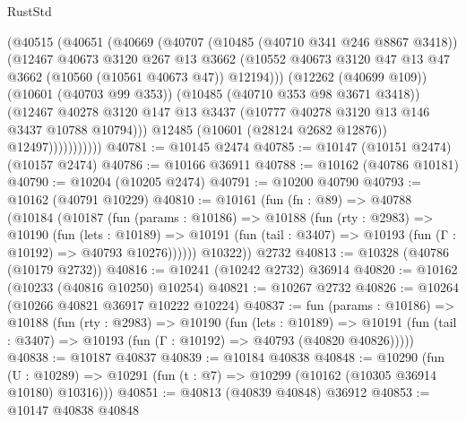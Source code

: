 \begin{lexlean}{RustStd}
\begin{coremodule}
                      (@40515
                        (@40651
                          (@40669
                            (@40707
                              (@10485 (@40710 @341 @246 @8867 @3418))
                              (@12467
                                @40673
                                @3120
                                @267
                                @13
                                @3662
                                (@10552
                                  @40673
                                  @3120
                                  @47
                                  @13
                                  @47
                                  @3662
                                  (@10560 (@10561 @40673 @47))
                                  @12194)))
                            (@12262 (@40699 @109))
                            (@10601 (@40703 @99 @353))
                            (@10485 (@40710 @353 @98 @3671 @3418))
                            (@12467
                              @40278
                              @3120
                              @147
                              @13
                              @3437
                              (@10777 @40278 @3120 @13 @146 @3437 @10788 @10794)))
                          @12485
                          (@10601 (@28124 @2682 @12876))
                          @12497)))))))))))
@40781 := @10145 @2474
@40785 := @10147 (@10151 @2474) (@10157 @2474)
@40786 := @10166 @36911
@40788 := @10162 (@40786 @10181)
@40790 := @10204 (@10205 @2474)
@40791 := @10200 @40790
@40793 := @10162 (@40791 @10229)
@40810 := @10161
    (fun (fn : @89) =>
    @40788
      (@10184
        (@10187
          (fun (params : @10186) =>
          @10188
            (fun (rty : @2983) =>
            @10190
              (fun (lets : @10189) =>
              @10191 (fun (tail : @3407) => @10193 (fun (Γ : @10192) => @40793 @10276))))))
        @10322))
    @2732
@40813 := @10328 (@40786 (@10179 @2732))
@40816 := @10241 (@10242 @2732) @36914
@40820 := @10162 (@10233 (@40816 @10250) @10254)
@40821 := @10267 @2732
@40826 := @10264 (@10266 @40821 @36917 @10222 @10224)
@40837 := fun (params : @10186) =>
  @10188
    (fun (rty : @2983) =>
    @10190
      (fun (lets : @10189) =>
      @10191 (fun (tail : @3407) => @10193 (fun (Γ : @10192) => @40793 (@40820 @40826)))))
@40838 := @10187 @40837
@40839 := @10184 @40838
@40848 := @10290
    (fun (U : @10289) => @10291 (fun (t : @7) => @10299 (@10162 (@10305 @36914 @10180) @10316)))
@40851 := @40813 (@40839 @40848) @36912
@40853 := @10147 @40838 @40848

\end{coremodule}
\end{lexlean}
